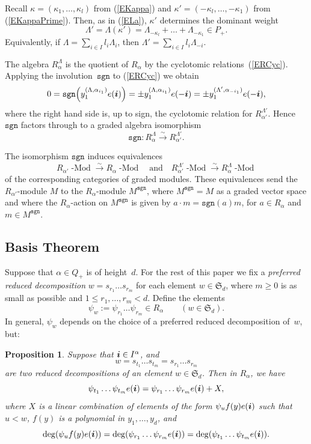 \documentclass[twoside,11pt,reqno]{amsart}
\numberwithin{equation}{section}
\newtheorem{Proposition}[equation]{Proposition}
\theoremstyle{definition}  %
\def\bi{\text{\boldmath$i$}}
\def\bijection{\overset{\sim}{\longrightarrow}}
\def\sgn{\mathtt{sgn}}
\newcommand{\0}{{\bar 0}}
\newcommand{\1}{{\bar 1}}
\newcommand{\al}{\alpha}
\def\Si{\mathfrak{S}}
\def\Mod#1{#1\!\operatorname{-Mod}}
\begin{document}
Recall  $\kappa=(\kappa_1,\dots,\kappa_l)$ from (\ref{EKappa}) and $\kappa'=(-\kappa_l,\dots,-\kappa_1)$ from (\ref{EKappaPrime}). 
Then, as in (\ref{ELa}),
$\kappa'$ determines the dominant weight
$$\Lambda'=\Lambda(\kappa')=\Lambda_{-\kappa_l}+\dots+\Lambda_{-\kappa_1}\in P_+.$$
Equivalently, if $\Lambda=\sum_{i\in I}l_i\Lambda_i$, then
$\Lambda'=\sum_{i\in I}l_i\Lambda_{-i}$. 

The algebra $R_\al^\Lambda$ is the quotient of $R_\al$ by the cyclotomic
relations~(\ref{ERCyc}). Applying the involution~$\sgn$ to (\ref{ERCyc}) we obtain
$$0=\sgn\Big(y_1^{(\Lambda,\alpha_{i_1})}e(\bi)\Big)
=\pm y_1^{(\Lambda,\alpha_{i_1})}e(-\bi) =\pm y_1^{(\Lambda',\alpha_{-i_1})}e(-\bi),$$ where
the right hand side is, up to sign, the cyclotomic relation for $R_{\al'}^{\Lambda'}$.  Hence $\sgn$ factors through
to a graded algebra isomorphism 
$$\sgn:R_{\al}^\Lambda\bijection R_{\alpha'}^{\Lambda'}.$$

The isomorphism $\sgn$ induces equivalences
$$\Mod{R_{\alpha'}}\bijection\Mod{R_\alpha}\quad\text{and}\quad
  \Mod{R_{\alpha'}^{\Lambda'}}\bijection\Mod{R_\alpha^\Lambda}$$
of the corresponding categories of graded modules. These equivalences send the
$R_{\al'}$-module $M$ to the $R_\al$-module $M^\sgn$, where $M^\sgn=M$ as
a graded vector space and where the $R_\al$-action on $M^\sgn$ is given by $a\cdot m=\sgn(a)m$, for $a\in R_\al$
and $m\in M^\sgn$. 


\subsection{\boldmath Basis Theorem}
Suppose that $\al\in Q_+$ is of height~$d$.  For the rest of this
paper we fix a {\em preferred reduced decomposition} $w=s_{r_1}\dots s_{r_m}$ for each element $w\in \Si_d$, 
where $m\ge0$ is as small as possible and $1\le r_1,\dots,r_m<d$. Define the elements
$$
\psi_w:=\psi_{r_1}\dots\psi_{r_m}\in R_\al \qquad (w\in \Si_d).
$$
In general, $\psi_w$ depends on the choice of a preferred reduced decomposition of~$w$, but:

\begin{Proposition}\label{PSubtle}%
Suppose that $\bi\in I^\al$, and 
$$w=s_{t_1}\dots s_{t_m}=s_{r_1}\dots s_{r_m}$$ 
are two reduced decompositions of an element $w\in \Si_d$. Then in $R_\al$, we have 
$$\psi_{t_1}\dots\psi_{t_m}e(\bi)=\psi_{r_1}\dots\psi_{r_m}e(\bi)+X,$$
where $X$ is a linear combination of elements of the form $\psi_uf(y)e(\bi)$ such that $u<w$, $f(y)$ is a polynomial in $y_1,\dots,y_d$,  and $$\deg(\psi_uf(y)e(\bi))=\deg(\psi_{r_1}\dots\psi_{r_m}e(\bi))=\deg(\psi_{t_1}\dots\psi_{t_m}e(\bi)).$$
\end{Proposition}
\end{document}
